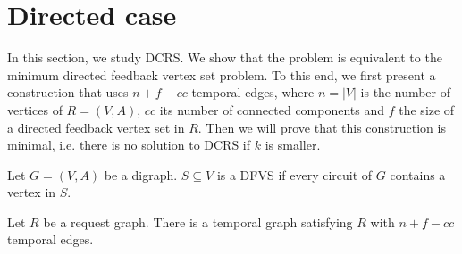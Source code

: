 \documentclass[11pt]{article}%
\begin{document}
\section{Directed case}
\label{sec:directed}
  In this section, we study DCRS. We show that the problem is equivalent to the minimum directed feedback vertex set problem. To this end, we first present a construction that uses $n+f-cc$ temporal edges, where $n=|V|$ is the number of vertices of $R=(V,A)$, $cc$ its number of connected components and $f$ the size of a directed feedback vertex set in $R$. Then we will prove that this construction is minimal, i.e. there is no solution to DCRS if $k$ is smaller.
  \begin{definition}
    Let $G=(V,A)$ be a digraph. $S \subseteq V$ is a DFVS if every circuit of $G$ contains a vertex in $S$.
  \end{definition}
  \begin{lemma}
    \label{lemma:constr}
    Let $R$ be a request graph. There is a temporal graph satisfying $R$ with $n+f-cc$ temporal edges.
  \end{lemma}
\end{document}
